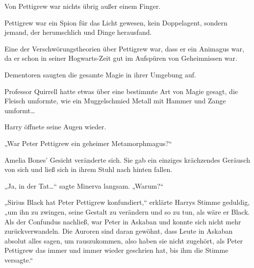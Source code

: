Von Pettigrew war nichts übrig außer einem Finger.

Pettigrew war ein Spion für das Licht gewesen, kein Doppelagent, sondern jemand, der herumschlich und Dinge herausfand.

Eine der Verschwörungstheorien über Pettigrew war, dass er ein Animagus war, da er schon in seiner Hogwarts-Zeit gut im Aufspüren von Geheimnissen war.

Dementoren saugten die gesamte Magie in ihrer Umgebung auf.

Professor Quirrell hatte etwas über eine bestimmte Art von Magie gesagt, die Fleisch umformte, wie ein Muggelschmied Metall mit Hammer und Zange umformt…

Harry öffnete seine Augen wieder.

„War Peter Pettigrew ein geheimer Metamorphmagus?“

Amelia Bones' Gesicht veränderte sich. Sie gab ein einziges krächzendes Geräusch von sich und ließ sich in ihrem Stuhl nach hinten fallen.

„Ja, in der Tat…“ sagte Minerva langsam. „Warum?“

„Sirius Black hat Peter Pettigrew konfundiert,“ erklärte Harrys Stimme geduldig,
„um ihn zu zwingen, seine Gestalt zu verändern und so zu tun, als wäre er Black. Als der Confundus nachließ, war Peter in Askaban und konnte sich nicht mehr zurückverwandeln. Die Auroren sind daran gewöhnt, dass Leute in Askaban absolut alles sagen, um rauszukommen, also haben sie nicht zugehört, als Peter Pettigrew das immer und immer wieder geschrien hat, bis ihm die Stimme versagte.“

